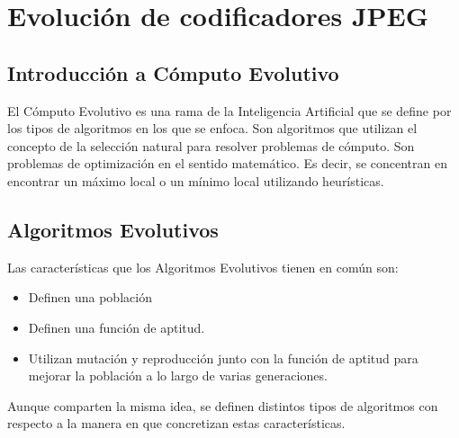 
\chapter{Evolución de codificadores JPEG}\label{ch:resultados_evolucion}

\section{Introducción a Cómputo Evolutivo}

El \gls{Cómputo Evolutivo} es una rama de la Inteligencia Artificial que se define
por los tipos de algoritmos en los que se enfoca. Son algoritmos que utilizan
el concepto de la selección natural para resolver problemas de cómputo. Son
problemas de optimización en el sentido matemático. Es decir, se concentran en
encontrar un máximo local o un mínimo local utilizando heurísticas.


\section{Algoritmos Evolutivos}

Las características que los Algoritmos Evolutivos tienen en común son:

\begin{itemize}
\item Definen una población
\item Definen una función de aptitud.
\item Utilizan mutación y reproducción junto con la función de aptitud para
mejorar la población a lo largo de varias generaciones.
\end{itemize}

Aunque comparten la misma idea, se definen distintos tipos de algoritmos con
respecto a la manera en que concretizan estas características.

